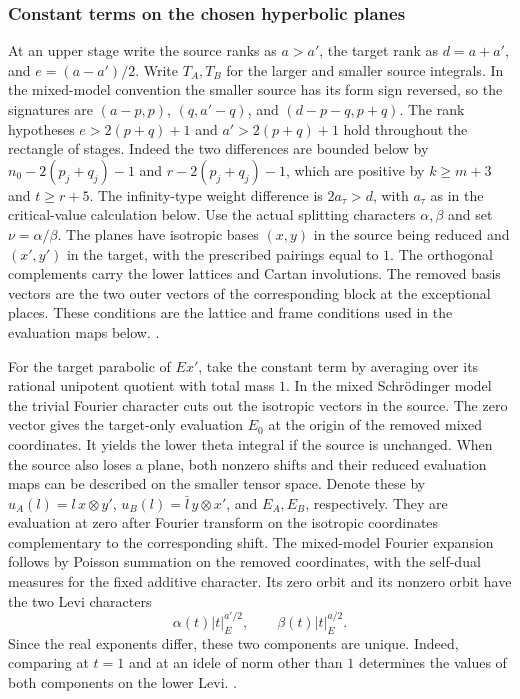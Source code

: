\subsubsection{Constant terms on the chosen hyperbolic planes}
At an upper stage write the source ranks as \(a>a'\), the target
rank as \(d=a+a'\), and \(e=(a-a')/2\). Write \(T_A,T_B\) for the
larger and smaller source integrals. In the mixed-model convention
the smaller source has its form sign reversed, so the signatures
are \((a-p,p)\), \((q,a'-q)\), and \((d-p-q,p+q)\).
The rank hypotheses \(e>2(p+q)+1\) and \(a'>2(p+q)+1\)
hold throughout the rectangle of stages. Indeed the two differences
are bounded below by \(n_0-2(p_j+q_j)-1\) and
\(r-2(p_j+q_j)-1\), which are positive by \(k\ge m+3\) and
\(t\ge r+5\). The infinity-type weight difference is
\(2a_\tau>d\), with \(a_\tau\) as in the critical-value
calculation below. Use the actual splitting characters
\(\alpha,\beta\) and set \(\nu=\alpha/\beta\). The planes have
isotropic bases \((x,y)\) in the source being reduced and
\((x',y')\) in the target, with the prescribed pairings equal to \(1\).
The orthogonal complements carry the lower lattices and Cartan
involutions. The removed basis vectors are the two outer vectors of
the corresponding block at the exceptional places. These conditions
are the lattice and frame conditions used in the evaluation maps below.
.

For the target parabolic of \(Ex'\), take the constant term by
averaging over its rational unipotent quotient with total mass \(1\).
In the mixed Schr\"odinger model the trivial Fourier character cuts
out the isotropic vectors in the source. The zero vector gives the
target-only evaluation \(E_0\) at the origin of the removed mixed
coordinates. It yields the lower theta integral if the source is
unchanged. When the source also loses a plane, both nonzero shifts
and their reduced evaluation maps can be described on the smaller
tensor space. Denote these by \(u_A(l)=l\,x\otimes y'\),
\(u_B(l)=\bar l\,y\otimes x'\), and \(E_A,E_B\), respectively.
They are evaluation at zero after Fourier transform on the
isotropic coordinates complementary to the corresponding shift.
The mixed-model Fourier expansion follows by Poisson summation on
the removed coordinates, with the self-dual measures for the fixed
additive character. Its zero orbit and its nonzero orbit have the two
Levi characters
\[
 \alpha(t)|t|_E^{a'/2},\qquad \beta(t)|t|_E^{a/2}.
\]
Since the real exponents differ, these two components are unique.
Indeed, comparing at \(t=1\) and at an idele of norm other than \(1\)
determines the values of both components on the lower Levi.
.

